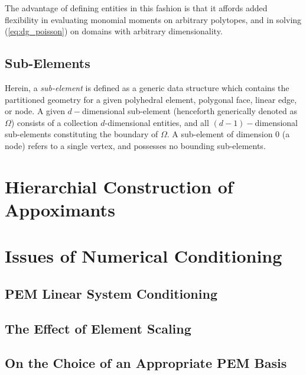 	The advantage of defining entities in this fashion is that it affords added flexibility in evaluating monomial moments on arbitrary polytopes, and in solving (\ref{eq:dg_poisson}) on domains with arbitrary dimensionality.
	
\subsection*{Sub-Elements}

	Herein, a \textit{sub-element} is defined as a generic data structure which contains the partitioned geometry for a given polyhedral element, polygonal face, linear edge, or node. A given $d-$dimensional sub-element (henceforth generically denoted as $\Omega$) consists of a collection $d$-dimensional entities, and all $(d-1)-$dimensional sub-elements constituting the boundary of $\Omega$. A sub-element of dimension $0$ (a node) refers to a single vertex, and possesses no bounding sub-elements.
	
	
	
\section{Hierarchial Construction of Appoximants}

\section{Issues of Numerical Conditioning}
\subsection{PEM Linear System Conditioning}
\subsection{The Effect of Element Scaling}
\subsection{On the Choice of an Appropriate PEM Basis}
